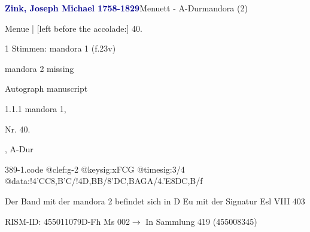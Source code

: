 \documentclass[twocolumn]{book}
\begin{document}
\par \vspace{7pt} \textcolor{darkblue}{\textbf{Zink, Joseph Michael  1758-1829}}\hfillplus{\textbf{[389]}}\newline Menuett - A-Dur\newline mandora (2)
\par \begin{itshape}[f.23v, at left:] Menue | [left before the accolade:] 40.\end{itshape} 
\par \textcolor{darkblue}{}  1 Stimmen: mandora 1  (f.23v)\newline \begin{small} mandora 2 missing\end{small} \newline Autograph manuscript
\par 1.1.1  mandora 1, \begin{itshape}Nr. 40.\end{itshape}, A-Dur  
\begin{filecontents*}{389-1.code}
@clef:g-2
@keysig:xFCG
@timesig:3/4
@data:!4'CC{8,B'C}/!4D,BB/{8'DC},BA{GA}/4.'E{8DC,B}/f
\end{filecontents*}
\newline
%
\par Der Band mit der mandora 2 befindet sich in D Eu mit der Signatur Esl VIII 403
\par RISM-ID: 455011079\newline D-Fh  Ms 002\newline $\rightarrow$ In Sammlung 419 (455008345)
      
\end{document}
